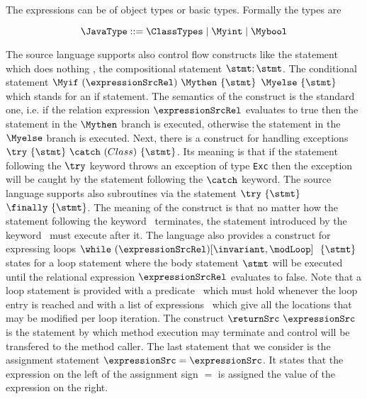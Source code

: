     The expressions can be of object types or basic types. Formally the types are 

$$ \JavaType ::= \ClassTypes \mid \Myint \mid \Mybool $$ 





  The source language supports also control flow constructs like  the statement which does nothing \Myskip, the  compositional statement
  $\stmt;\stmt$. The conditional statement
  $\Myif \ (\expressionSrcRel) \ \Mythen \ \{ \stmt \} $ $  \Myelse \ \{ \stmt \}  $ which stands for
  an if statement.%
   The semantics of the construct is the standard one, i.e. if the relation expression $\expressionSrcRel$ 
  evaluates to true then the statement in the $ \Mythen$ branch is executed, otherwise the statement in the
  $\Myelse$ branch is executed. Next, there is a construct for handling exceptions $ \try  \ \{ \stmt \}  \ \catch \ ( Class  )\ \{ \stmt \}  $.
  Its meaning is that if the statement following the $ \try $ keyword throws an exception of type \texttt{Exc} then
  the exception will be caught by the statement following the  $ \catch $ keyword. The source language supports also 
  subroutines via the statement $ \try  \ \{ \stmt \}  $ $ \finally \ \{ \stmt \}$.  The meaning of the construct is that  
  no matter how the statement following the keyword \try \ terminates,
  the statement introduced by the keyword \finally \ must execute after it. The language also provides a construct for expressing loops 
   $ \while \ (\expressionSrcRel) \lbrack \invariant, \modLoop \rbrack \ \do \ \{ \stmt \} $ states for a loop statement where the body 
   statement $ \stmt$ will be executed until the relational expression  $\expressionSrcRel$ evaluates to false.
   Note that a loop statement is provided with a predicate \invariant \ which must hold whenever the loop entry is reached and with a list of expressions
   \modLoop \ which give all the locations that  may be modified per loop iteration. The construct $ \returnSrc \  \expressionSrc $ is
   the statement by which method execution may terminate and control will be transfered to the method caller.
   The last statement that we consider is the assignment statement $ \expressionSrc = \expressionSrc$.
    It states that the expression on the left of the assignment sign $=$ is assigned the value of the expression on the right.

